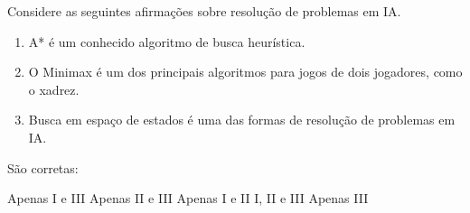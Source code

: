 \documentclass[12pt, addpoints]{exam}
\begin{document}
\begin{questions}
\begin{choices}
\end{choices}

\question
Considere as seguintes afirmações sobre resolução de problemas em IA.
\begin{enumerate}[label=\Roman*.]
    \item A* é um conhecido algoritmo de busca heurística.
    \item O Minimax é um dos principais algoritmos para jogos de dois jogadores, como o xadrez.
    \item Busca em espaço de estados é uma das formas de resolução de problemas em IA.
\end{enumerate}
São corretas:
\begin{choices}
\choice Apenas I e III
\choice Apenas II e III
\choice Apenas I e II
\choice I, II e III
\choice Apenas III
\end{choices}



    \end{questions}
    
\end{document}
